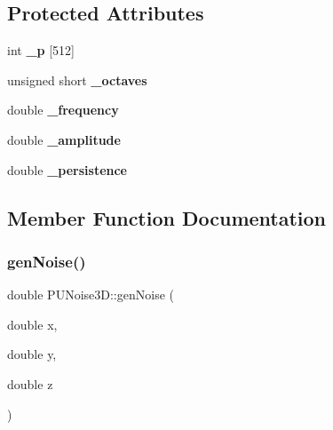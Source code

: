\subsection*{Protected Attributes}
\begin{DoxyCompactItemize}
\item 
\mbox{\label{classPUNoise3D_ab5e325b24b9342723731717020c5bcc5}} 
int {\bfseries \+\_\+p} \mbox{[}512\mbox{]}
\item 
\mbox{\label{classPUNoise3D_aada14a636db488f3a8f0a1f2f939ca57}} 
unsigned short {\bfseries \+\_\+octaves}
\item 
\mbox{\label{classPUNoise3D_a35861968cbbee9d3460f2285f619ea83}} 
double {\bfseries \+\_\+frequency}
\item 
\mbox{\label{classPUNoise3D_a434d8289d2943738376dd79022972fe4}} 
double {\bfseries \+\_\+amplitude}
\item 
\mbox{\label{classPUNoise3D_a755422e9e44c4e4a8820e15266229d33}} 
double {\bfseries \+\_\+persistence}
\end{DoxyCompactItemize}


\subsection{Member Function Documentation}
\mbox{\label{classPUNoise3D_a16c5a5e589aa77780a872dd460dd9e79}} 
\subsubsection{\texorpdfstring{gen\+Noise()}{genNoise()}\hspace{0.1cm}{\footnotesize\ttfamily [1/2]}}
{\footnotesize\ttfamily double P\+U\+Noise3\+D\+::gen\+Noise (\begin{DoxyParamCaption}\item[{double}]{x,  }\item[{double}]{y,  }\item[{double}]{z }\end{DoxyParamCaption})\hspace{0.3cm}{\ttfamily [protected]}}


